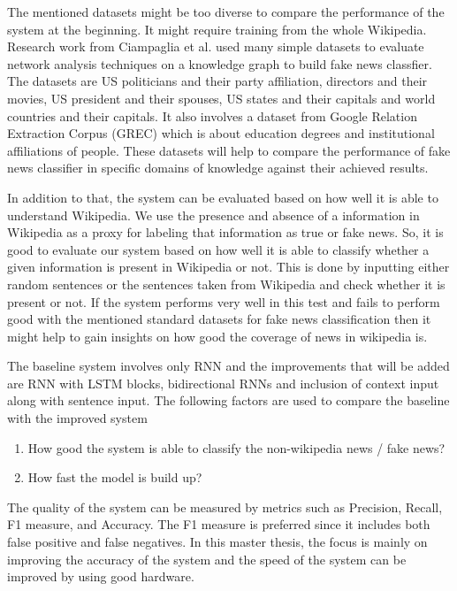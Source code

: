 \documentclass[a4paper, 11pt]{article}
\begin{document}
The mentioned datasets might be too diverse to compare the performance of the system at the beginning. It might require training from the whole Wikipedia. Research work from Ciampaglia et al. \cite{Ciampaglia2015} used many simple datasets to evaluate network analysis techniques on a knowledge graph to build fake news classfier. The datasets are US politicians and their party affiliation, directors and their movies, US president and their spouses, US states and their capitals and world countries and their capitals. It also involves a dataset from Google Relation Extraction Corpus (GREC) which is about education degrees and institutional affiliations of people. These datasets will help to compare the performance of fake news classifier in specific domains of knowledge against their achieved results.

In addition to that, the system can be evaluated based on how well it is able to understand Wikipedia. We use the presence and absence of a information in Wikipedia as a proxy for labeling that information as true or fake news. So, it is good to evaluate our system based on how well it is able to classify whether a given information is present in Wikipedia or not. This is done by inputting either random sentences or the sentences taken from Wikipedia and check whether it is present or not. \color{red}If the system performs very well in this test and fails to perform good with the mentioned standard datasets for fake news classification then it might help to gain insights on how good the coverage of news in wikipedia is. \color{black}

The baseline system involves only RNN and the improvements that will be added are RNN with LSTM blocks, bidirectional RNNs and inclusion of context input along with sentence input. The following factors are used to compare the baseline with the improved system
\begin{enumerate}
\item How good the system is able to classify the non-wikipedia news / fake news?
\item How fast the model is build up?
\end{enumerate}

The quality of the system can be measured by metrics such as Precision, Recall, F1 measure, and Accuracy. The F1 measure is preferred since it includes both false positive and false negatives. In this master thesis, the focus is mainly on improving the accuracy of the system and the speed of the system can be improved by using good hardware.
\end{document}
